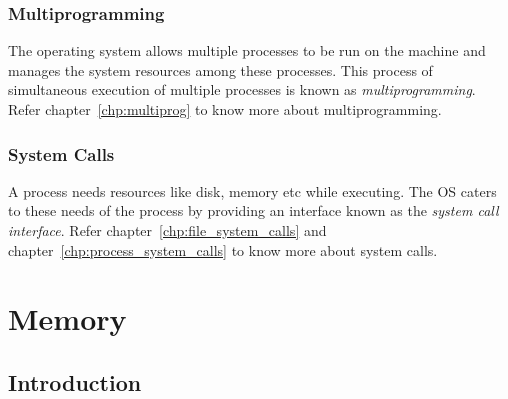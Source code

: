 \documentclass[11pt]{report}
\begin{document}
\subsection{Multiprogramming}
The operating system allows multiple processes to be run on the machine and manages the system resources among these processes. 
This process of simultaneous execution of multiple processes is known as \emph{multiprogramming}. Refer chapter~\ref{chp:multiprog} to know more about multiprogramming.

\subsection{System Calls}
A process needs resources like disk, memory etc while executing. The OS caters to these needs of the process by providing an interface  known as the \emph{system call interface}. Refer chapter~\ref{chp:file_system_calls} and chapter~\ref{chp:process_system_calls} to know more about system calls.



\chapter{Memory}
\label{chp:memory}

\section{Introduction} 
\end{document}
